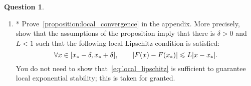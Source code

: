\documentclass[11pt]{article}
\theoremstyle{definition}
\newtheorem{question}{Question}
\theoremstyle{remark}
\theoremstyle{plain}%
\begin{document}
\begin{question}
\begin{enumerate}
        \item
            *
            Prove~\cref{proposition:local_convergence} in the appendix.
            More precisely, show that the assumptions of the proposition imply that there is $\delta > 0$ and $L < 1$ such that the following local Lipschitz condition is satisfied:
            \begin{equation}
                \label{eq:local_lipschitz}
                \forall x \in [x_* - \delta, x_* + \delta],
                \qquad
                \lvert F(x) - F(x_*) \rvert \leqslant L \lvert x - x_*\rvert.
            \end{equation}
            You do not need to show that~\eqref{eq:local_lipschitz} is sufficient to guarantee local exponential stability;
            this is taken for granted.
    \end{enumerate}
\end{question}

\newpage

\newpage
\end{document}
